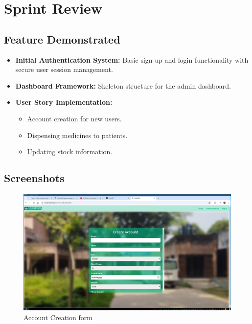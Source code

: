 \documentclass[a4paper,12pt]{article}
\begin{document}
\section{Sprint Review}
\subsection{Feature Demonstrated}
\begin{itemize}
    \item \textbf{Initial Authentication System: }Basic sign-up and login functionality with secure user session management.
    \item \textbf{Dashboard Framework: }Skeleton structure for the admin dashboard.
    \item \textbf{User Story Implementation: }
        \begin{itemize}
            \item Account creation for new users.
            \item Dispensing medicines to patients.
            \item Updating stock information.
        \end{itemize}
\end{itemize}
\subsection{Screenshots}
\begin{figure}[H]
    \centering
    \includegraphics[width=1\textwidth]{images/spr1output2.png}
    \caption{Account Creation form}
    \label{fig:accountcreation}
\end{figure}
\end{document}

